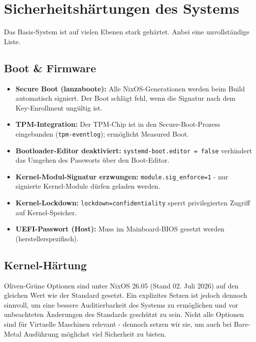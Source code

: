 \section{Sicherheitshärtungen des Systems}
\label{sec:hardening}
Das Basis-System ist auf vielen Ebenen stark gehärtet. Anbei eine unvollständige Liste.

\subsection{Boot \& Firmware}
\begin{itemize}
  \item \textbf{Secure Boot (lanzaboote):} Alle NixOS-Generationen werden beim Build automatisch signiert. Der Boot schlägt fehl, wenn die Signatur nach dem Key-Enrollment ungültig ist.
  \item \textbf{\acs{TPM}-Integration:} Der \ac{TPM}-Chip ist in den Secure-Boot-Prozess eingebunden (\texttt{tpm-eventlog}); ermöglicht Measured Boot.
  \item \textbf{Bootloader-Editor deaktiviert:} \texttt{systemd-boot.editor = false} verhindert das Umgehen des Passworts über den Boot-Editor.
  \item \textbf{Kernel-Modul-Signatur erzwungen:} \texttt{module.sig\_enforce=1} - nur signierte Kernel-Module dürfen geladen werden.
  \item \textbf{Kernel-Lockdown:} \texttt{lockdown=confidentiality} sperrt privilegierten Zugriff auf Kernel-Speicher.
  \item \textbf{\acs{UEFI}-Passwort (Host):} Muss im Mainboard-\ac{BIOS} gesetzt werden (herstellerspezifisch).
\end{itemize}

\subsection{Kernel-Härtung}
\textcolor{OliveGreen}{Oliven-Grüne} Optionen sind unter NixOS 26.05 (Stand 02. Juli 2026) auf den gleichen Wert wie der Standard gesetzt. Ein explizites Setzen ist jedoch dennoch sinnvoll, um eine bessere Auditierbarkeit des Systems zu ermöglichen und vor unbeachteten Änderungen des Standards geschützt zu sein.
Nicht alle Optionen sind für Virtuelle Maschinen relevant - dennoch setzen wir sie, um auch bei Bare-Metal Ausführung möglichst viel Sicherheit zu bieten.


